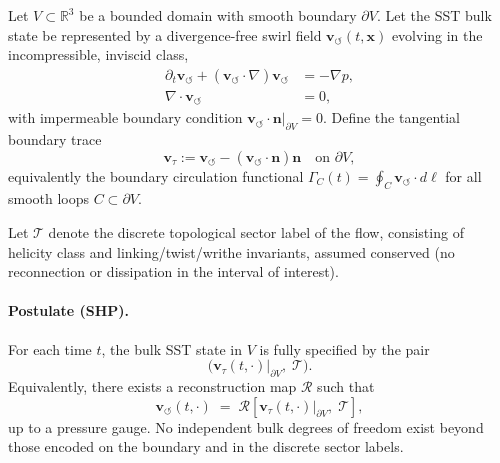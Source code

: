 \documentclass[11pt]{article}
\begin{document}
    Let $V\subset\mathbb{R}^3$ be a bounded domain with smooth boundary $\partial V$.
    Let the SST bulk state be represented by a divergence-free swirl field
    $\mathbf{v}_{\!\boldsymbol{\circlearrowleft}}(t,\mathbf{x})$ evolving in the
    incompressible, inviscid class,
    \begin{align}
        \partial_t \mathbf{v}_{\!\boldsymbol{\circlearrowleft}}
        + (\mathbf{v}_{\!\boldsymbol{\circlearrowleft}}\!\cdot\nabla)
        \mathbf{v}_{\!\boldsymbol{\circlearrowleft}}
        &= -\nabla p,
        \\
        \nabla\cdot\mathbf{v}_{\!\boldsymbol{\circlearrowleft}} &= 0,
    \end{align}
    with impermeable boundary condition
    $\mathbf{v}_{\!\boldsymbol{\circlearrowleft}}\!\cdot\mathbf{n}|_{\partial V}=0$.
    Define the tangential boundary trace
    \begin{equation}
        \mathbf{v}_\tau :=
        \mathbf{v}_{\!\boldsymbol{\circlearrowleft}}
        - (\mathbf{v}_{\!\boldsymbol{\circlearrowleft}}\!\cdot\mathbf{n})\mathbf{n}
        \quad \text{on } \partial V,
    \end{equation}
    equivalently the boundary circulation functional
    $\Gamma_C(t)=\oint_C \mathbf{v}_{\!\boldsymbol{\circlearrowleft}}\cdot
    d\boldsymbol{\ell}$ for all smooth loops $C\subset\partial V$.

    Let $\mathcal{T}$ denote the discrete topological sector label of the flow,
    consisting of helicity class and linking/twist/writhe invariants, assumed
    conserved (no reconnection or dissipation in the interval of interest).

    \paragraph{Postulate (SHP).}
        For each time $t$, the bulk SST state in $V$ is fully specified by the pair
        \begin{equation}
            \big(\mathbf{v}_\tau(t,\cdot)\big|_{\partial V},\;\mathcal{T}\big).
        \end{equation}
        Equivalently, there exists a reconstruction map $\mathcal{R}$ such that
        \begin{equation}
            \mathbf{v}_{\!\boldsymbol{\circlearrowleft}}(t,\cdot)
            \;=\;
            \mathcal{R}\!\left[
                             \mathbf{v}_\tau(t,\cdot)\big|_{\partial V},\;
                             \mathcal{T}
            \right],
        \end{equation}
        up to a pressure gauge. No independent bulk degrees of freedom exist beyond
        those encoded on the boundary and in the discrete sector labels.
\end{document}
